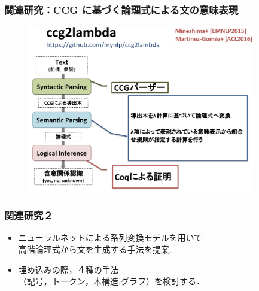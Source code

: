 \documentclass[dvipdfmx,cjk]{beamer}
\begin{document}
\begin{frame}
\frametitle{関連研究：CCG に基づく論理式による文の意味表現}
\begin{center}
\begin{figure}[h]
	\includegraphics[width=10cm]{c2l.png}
        \label{fig:c2l}
\end{figure}
\end{center}

\end{frame}




\begin{frame}
\frametitle{関連研究２}
\begin{center}
\end{center}
\begin{block}{}
  \begin{itemize}
    \item {\color{berry}ニューラルネットによる系列変換モデル}を用いて\\高階論理式から文を生成する手法を提案.
    \item 埋め込みの際，４種の手法\\（記号，トークン，木構造,グラフ）を検討する．
  \end{itemize}
\end{block}

\end{frame}
\end{document}
